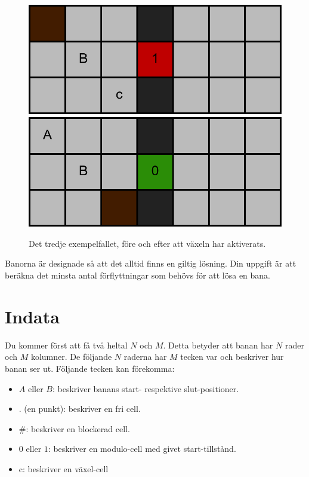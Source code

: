\begin{figure}[!htb]
\includegraphics[width=\linewidth]{m0.png}
\endminipage\hfill
{}
\includegraphics[width=\linewidth]{m1.png}
\endminipage
\caption{Det tredje exempelfallet, före och efter att växeln har aktiverats.}
\end{figure}

\noindent Banorna är designade så att det alltid finns en giltig lösning. Din uppgift är att beräkna det minsta antal förflyttningar som behövs för att lösa en bana.

\section*{Indata}

Du kommer först att få två heltal $N$ och $M$. Detta betyder att banan har $N$ rader och $M$ kolumner.
De följande $N$ raderna har $M$ tecken var och beskriver hur banan ser ut. Följande tecken kan förekomma:

\begin{itemize}
\item $A$ eller $B$: beskriver banans start- respektive slut-positioner.
\item . (en punkt): beskriver en fri cell.
\item \#: beskriver en blockerad cell.
\item $0$ eller $1$: beskriver en modulo-cell med givet start-tillstånd.
\item c: beskriver en växel-cell
\end{itemize}

